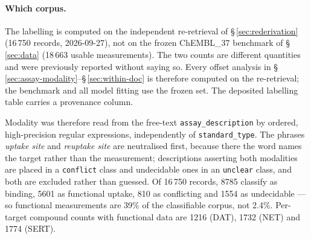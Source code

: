 \documentclass[11pt,a4paper]{article}
\begin{document}
\paragraph{Which corpus.} The labelling is computed on the independent re-retrieval of
\S\,\ref{sec:rederivation} (16\,750 records, 2026-09-27), not on the frozen ChEMBL\_37
benchmark of \S\,\ref{sec:data} (18\,663 usable measurements). The two counts are
different quantities and were previously reported without saying so. Every offset analysis
in \S\,\ref{sec:assay-modality}--\S\,\ref{sec:within-doc} is therefore computed on the
re-retrieval; the benchmark and all model fitting use the frozen set. The deposited
labelling table carries a provenance column.

Modality was therefore read from the free-text \texttt{assay\_description} by ordered,
high-precision regular expressions, independently of \texttt{standard\_type}. The
phrases \emph{uptake site} and \emph{reuptake site} are neutralised first, because
there the word names the target rather than the measurement; descriptions asserting
both modalities are placed in a \texttt{conflict} class and undecidable ones in an
\texttt{unclear} class, and both are excluded rather than guessed. Of 16\,750 records,
8785 classify as binding, 5601 as functional uptake, 810 as conflicting and 1554 as
undecidable --- so functional measurements are 39\% of the classifiable corpus, not
2.4\%. Per-target compound counts with functional data are 1216 (DAT), 1732 (NET) and
1774 (SERT).
\end{document}
